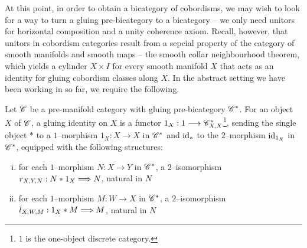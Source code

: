 \documentclass[./Thick_TQFTs_and_Quantum_Information.tex]{subfiles}
\begin{document}
At this point, in order to obtain a bicategory of cobordisms, we may wish to
look for a way to turn a gluing pre-bicategory to a bicategory -- we only need
unitors for horizontal composition and a unity coherence axiom.  Recall,
however, that unitors in cobordism categories result from a sepcial property of
the category of smooth manifolds and smooth maps -- the smooth collar
neighbourhood theorem, which yields a cylinder $X \times I$ for every smooth
manifold $X$ that acts as an identity for gluing cobordism classes along $X$. In
the abstract setting we have been working in so far, we require the following.
\begin{defn}\label{def:glueid}
Let $\mathscr{C}$ be a pre-manifold category with gluing pre-bicategory $\mathscr{C}^*$.
For an object $X$ of $\mathscr{C}$, a gluing identity on $X$ is a functor
$1_X : 1 \stackrel{}{\longrightarrow} \mathscr{C}^*_{X, X}$\footnote{$1$ is the one-object discrete category.},
sending the single object $*$ to a $1$--morphism $1_X : X \to X$ in $\mathscr{C}^*$
and $\text{id}_*$ to the $2$--morphism $\text{id}_{1_X}$ in $\mathscr{C}^*$, equipped with the
following structures:
\begin{enumerate}[(i)]
\setlength{\itemsep}{0pt}
\item for each $1$--morphism $N : X \to Y$ in $\mathscr{C}^*$, a $2$--isomorphism
$r_{X, Y, N} : N * 1_X \stackrel{}{\Longrightarrow} N$, natural in $N$
\item for each $1$--morphism $M : W \to X$ in $\mathscr{C}^*$, a $2$--isomorphism
$l_{X, W, M} : 1_X * M \stackrel{}{\Longrightarrow} M$, natural in $N$
\end{enumerate}
\end{defn}
\end{document}
